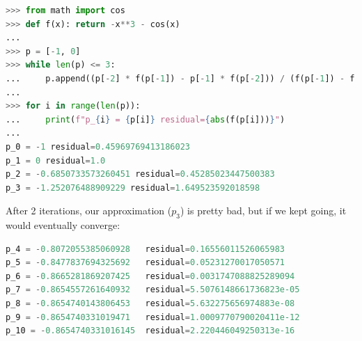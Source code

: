 \documentclass{article}
\begin{document}
\bigskip
\begin{prob}
\end{prob}
\begin{lstlisting}[language=Python]
>>> from math import cos
>>> def f(x): return -x**3 - cos(x)
... 
>>> p = [-1, 0]
>>> while len(p) <= 3:
...     p.append((p[-2] * f(p[-1]) - p[-1] * f(p[-2])) / (f(p[-1]) - f(p[-2])))
... 
>>> for i in range(len(p)):
...     print(f"p_{i} = {p[i]} residual={abs(f(p[i]))}")
... 
p_0 = -1 residual=0.45969769413186023
p_1 = 0 residual=1.0
p_2 = -0.6850733573260451 residual=0.45285023447500383
p_3 = -1.252076488909229 residual=1.649523592018598
\end{lstlisting}
After 2 iterations, our approximation ($p_3$) is pretty bad, but if we kept going, it would eventually converge:
\begin{lstlisting}[language=Python]
p_4 = -0.8072055385060928	residual=0.16556011526065983
p_5 = -0.8477837694325692	residual=0.05231270017050571
p_6 = -0.8665281869207425	residual=0.0031747088825289094
p_7 = -0.8654557261640932	residual=5.5076148661736823e-05
p_8 = -0.8654740143806453	residual=5.632275656974883e-08
p_9 = -0.8654740331019471	residual=1.0009770790020411e-12
p_10 = -0.8654740331016145	residual=2.220446049250313e-16
\end{lstlisting}
\end{document}
